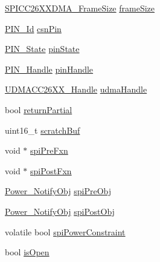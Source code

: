 \begin{DoxyCompactItemize}
\item 
\hyperlink{_s_p_i_c_c26_x_x_d_m_a_8h_a1c5afb8465d3e8689a82088ad25fc81a}{S\+P\+I\+C\+C26\+X\+X\+D\+M\+A\+\_\+\+Frame\+Size} \hyperlink{struct_s_p_i_c_c26_x_x_d_m_a___object_add4190b9bb9d623e4593056021ec19a8}{frame\+Size}
\item 
\hyperlink{_p_i_n_8h_a9ae8197f460bb76ea09a84f47d09921f}{P\+I\+N\+\_\+\+Id} \hyperlink{struct_s_p_i_c_c26_x_x_d_m_a___object_a436d2148d95d8cbb1f4ab7750ea4e081}{csn\+Pin}
\item 
\hyperlink{_p_i_n_8h_a36ef69d50df6baa6973482669c24a522}{P\+I\+N\+\_\+\+State} \hyperlink{struct_s_p_i_c_c26_x_x_d_m_a___object_a2bf05a9ab13570614b205faef838a60f}{pin\+State}
\item 
\hyperlink{_p_i_n_8h_afb2de52b054638f63c39df1f30a0d88d}{P\+I\+N\+\_\+\+Handle} \hyperlink{struct_s_p_i_c_c26_x_x_d_m_a___object_a253e7758ec60b0deb706c12bf2cac7d8}{pin\+Handle}
\item 
\hyperlink{_u_d_m_a_c_c26_x_x_8h_a969a9feb0f822c4764ef1da2ff5066cf}{U\+D\+M\+A\+C\+C26\+X\+X\+\_\+\+Handle} \hyperlink{struct_s_p_i_c_c26_x_x_d_m_a___object_ad1b5299f66bd0ed6a1feb66bb17dbb70}{udma\+Handle}
\item 
bool \hyperlink{struct_s_p_i_c_c26_x_x_d_m_a___object_aaad712b779c3c23a1a9c7b4e444c82fd}{return\+Partial}
\item 
uint16\+\_\+t \hyperlink{struct_s_p_i_c_c26_x_x_d_m_a___object_a9d4b85fd8a20f01c8ef9d83818394678}{scratch\+Buf}
\item 
void $\ast$ \hyperlink{struct_s_p_i_c_c26_x_x_d_m_a___object_accb678d98cf66ed2d15a6ddf9ea993ae}{spi\+Pre\+Fxn}
\item 
void $\ast$ \hyperlink{struct_s_p_i_c_c26_x_x_d_m_a___object_a1f7b7de23148a962619517a66132a602}{spi\+Post\+Fxn}
\item 
\hyperlink{struct_power___notify_obj}{Power\+\_\+\+Notify\+Obj} \hyperlink{struct_s_p_i_c_c26_x_x_d_m_a___object_aaf7de912547eb0e0d6040e816329d942}{spi\+Pre\+Obj}
\item 
\hyperlink{struct_power___notify_obj}{Power\+\_\+\+Notify\+Obj} \hyperlink{struct_s_p_i_c_c26_x_x_d_m_a___object_a0507bf0f4300ed38ede4a414a619a8ea}{spi\+Post\+Obj}
\item 
volatile bool \hyperlink{struct_s_p_i_c_c26_x_x_d_m_a___object_adbcda45a5bec189d12b7122426126181}{spi\+Power\+Constraint}
\item 
bool \hyperlink{struct_s_p_i_c_c26_x_x_d_m_a___object_a54ded097b995c036bd7e12fc2e00139f}{is\+Open}
\end{DoxyCompactItemize}


